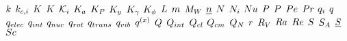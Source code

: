 \begin{mdframed}
$\thermcond$ \newline
$\masstranscoeff$ \newline
$\dilfac$ \newline
$\taylordisp$ \newline
$\partcoeff$ \newline
$\eqconst$ \newline
$\peqconst$ \newline
$\yeqconst$ \newline
$\acteqconst$ \newline
$\fugeqconst$ \newline
$\length$ \newline
$\mass$ \newline
$\mw$ \newline
$\normvec$ \newline
$\nummoles$ \newline
$\massspecflux{i}$ \newline
$\nusselt$ \newline
$\p$ \newline
$\prob$ \newline
$\peclet$ \newline
$\prandtl$ \newline
$\charge{i}$ \newline
$\heatflux$ \newline
$\empc$ \newline
$\impc$ \newline
$\nmpc$ \newline
$\rmpc$ \newline
$\tmpc$ \newline
$\vmpc$ \newline
$\dufour$ \newline
$\heatflow$ \newline
$\ipc$ \newline
$\cpc$ \newline
$\cmpc$ \newline
$\cpf$ \newline
$\pos$ \newline
$\specsource$ \newline
$\rayleigh$ \newline
$\reynolds$ \newline
$\entropy$ \newline
$\sa$ \newline
$\stressvec$ \newline
$\schmidt$ \newline

\end{mdframed}
